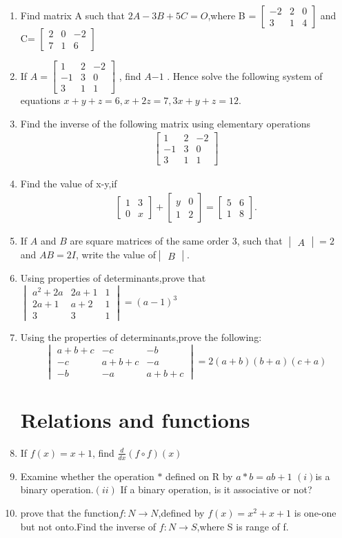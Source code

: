 \documentclass{article}
\begin{document}
\providecommand{\mydet}[1]{\ensuremath{\begin{vmatrix}#1\end{vmatrix}}}
\providecommand{\myvec}[1]{\ensuremath{\begin{bmatrix}#1\end{bmatrix}}}
\providecommand{\brak}[1]{\ensuremath{\left(#1\right)}}
\providecommand{\cbrak}[1]{\ensuremath{\left\{#1\right\}}}
\begin{enumerate}
\section {Matrices}
             \item Find matrix A such that $ 2A - 3B + 5C = O $,where B = $\myvec{-2 & 2 & 0 \\3 & 1 & 4 }$ and C= $\myvec{2&0&-2\\7&1&6 }$
             \item If $A=\myvec {1&2&-2 \\-1 &3&0\\3&1&1}$ , find $A{-1}$ . Hence solve the following system of equations $x+y+z= 6,x+2z=7,3x+y+z=12$. 
	     \item Find the inverse of the following matrix using elementary operations \begin{align*}\myvec{1&2&-2\\-1&3&0\\3&1&1}\end{align*}
		     \item Find the value of x-y,if \begin{align*}\myvec{1&3\\0&x}+\myvec{y&0\\1&2}=\myvec{5&6\\1&8}.\end{align*} 
              \item If $A$ and $B$ are square matrices of the same order 3, such that $\mydet{A} = 2$ and $AB = 2I$, write the value of$\mydet{B}$.
              \item Using properties of determinants,prove that $\mydet{a^2+2a & 2a+1 & 1\\2a +1& a+2 & 1\\3 & 3 & 1}= (a-1)^3$
              \item Using the properties of determinants,prove the following:\[\mydet{a+b+c&-c&-b\\-c&a+b+c&-a\\-b&-a&a+b+c}=2(a+b)(b+a)(c+a)\]             
\section{Relations and functions}
           \item If $f(x) = x + 1$, find $\frac{d}{dx}\brak{f \circ f}\brak{x}$
	   \item Examine whether the operation $*$ defined on R by $a * b = ab + 1$ $\brak{i}$is a binary operation.$\brak{ii}$ If a binary operation, is it associative or not?
            \item prove that the function$f:N \rightarrow N$,defined by $f(x)=x^2+x+1$ is one-one but not onto.Find the inverse of $f:N\rightarrow S$,where S is range of f.

\end{enumerate}
\end{document}
